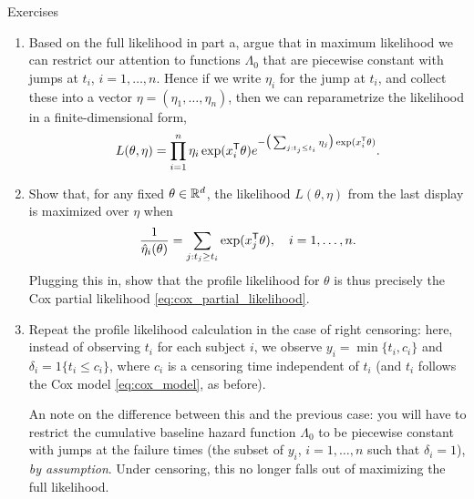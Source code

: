 \begin{xcb}{Exercises}
\begin{enumerate}[label=\thechapter.\arabic*]
\begin{enumerate}[label=\alph*.]
\item Based on the full likelihood in part a, argue that in maximum likelihood 
  we can restrict our attention to functions $\Lambda_0$ that are piecewise
  constant with jumps at $t_i$, $i=1,\dots,n$. Hence if we write $\eta_i$ for  
  the jump at $t_i$, and collect these into a vector $\eta = (\eta_1, \dots,
  \eta_n)$, then we can reparametrize the likelihood in a finite-dimensional
  form,     
  \[
  L(\theta, \eta) = \prod_{i=1}^n \eta_i \exp(x_i^{\mathsf{T}} \theta)
  e^{-\big(\sum_{j : t_j \leq t_i} \eta_j\big) \exp(x_i^{\mathsf{T}} \theta)}. 
  \]

\item Show that, for any fixed $\theta \in \mathbb{R}^d$, the likelihood $L(\theta,
  \eta)$ from the last display is maximized over $\eta$ when
  \[
  \frac{1}{\hat\eta_i(\theta)} = \sum_{j : t_j \geq t_i} \exp(x_j^{\mathsf{T}} \theta),
  \quad i=1,\dots,n. 
  \]
  Plugging this in, show that the profile likelihood for $\theta$ is thus
  precisely the Cox partial likelihood \eqref{eq:cox_partial_likelihood}. 

\item Repeat the profile likelihood calculation in the case of right censoring:
  here, instead of observing $t_i$ for each subject $i$, we observe $y_i =
  \min\{t_i, c_i\}$ and $\delta_i = 1\{t_i \leq c_i\}$, where $c_i$ is a
  censoring time independent of $t_i$ (and $t_i$ follows the Cox model
  \eqref{eq:cox_model}, as before).     

  \smallskip
  An note on the difference between this and the previous case: you will have to
  restrict the cumulative baseline hazard function $\Lambda_0$ to be piecewise
  constant with jumps at the failure times (the subset of $y_i$, $i=1,\dots,n$
  such that $\delta_i = 1$), \emph{by assumption}. Under censoring, this no
  longer falls out of maximizing the full likelihood.              
\end{enumerate} 
\end{enumerate}
\end{xcb}